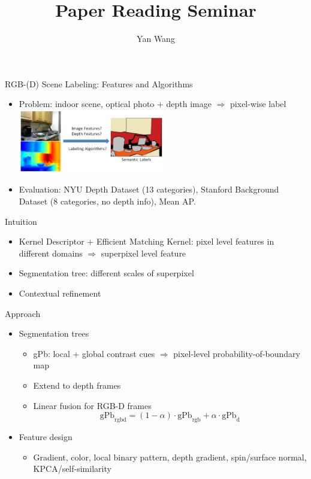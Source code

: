 \documentclass[12pt]{beamer}
\author{Yan Wang}
\title{Paper Reading Seminar}
\subtitle{}
\begin{document}
\begin{frame}[plain]
	\titlepage
\end{frame}

\begin{frame}{RGB-(D) Scene Labeling: Features and Algorithms}
	\begin{itemize}
		\item Problem: indoor scene, optical photo + depth image $\Rightarrow$ pixel-wise label \\
		\medskip
		\includegraphics[width=0.5\textwidth]{fig1.png} \\
		\item Evaluation: NYU Depth Dataset (13 categories), Stanford Background Dataset (8 categories, no depth info), Mean AP.
	\end{itemize}
\end{frame}

\begin{frame}{Intuition}
	\begin{itemize}
		\item Kernel Descriptor + Efficient Matching Kernel: pixel level features in different domains $\Rightarrow$ superpixel level feature
		\item Segmentation tree: different scales of superpixel
		\item Contextual refinement
	\end{itemize}
\end{frame}

\begin{frame}{Approach}
	\begin{itemize}
		\item Segmentation trees
		\begin{itemize}
			\item gPb: local + global contrast cues $\Rightarrow$ pixel-level probability-of-boundary map
			\item Extend to depth frames
			\item Linear fusion for RGB-D frames \\
            \[\text{gPb}_\text{rgbd} = (1 - \alpha) \cdot \text{gPb}_\text{rgb} + \alpha \cdot \text{gPb}_\text{d}\]
		\end{itemize}
		\item Feature design
		\begin{itemize}
			\item Gradient, color, local binary pattern, depth gradient, spin/surface normal, KPCA/self-similarity
		\end{itemize}
	\end{itemize}
\end{frame}
\end{document}
